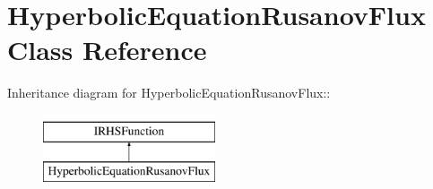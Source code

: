 \hypertarget{classHyperbolicEquationRusanovFlux}{
\section{HyperbolicEquationRusanovFlux Class Reference}
\label{classHyperbolicEquationRusanovFlux}
}
Inheritance diagram for HyperbolicEquationRusanovFlux::\begin{figure}[H]
\begin{center}
\leavevmode
\includegraphics[height=2cm]{classHyperbolicEquationRusanovFlux}
\end{center}
\end{figure}
